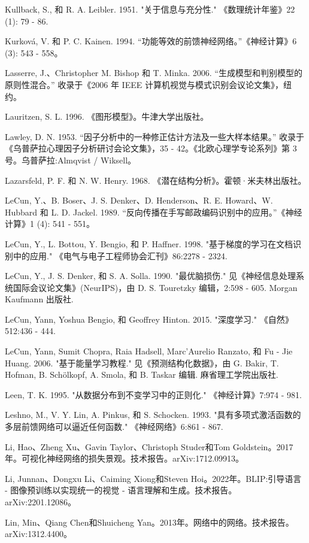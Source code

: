 \documentclass[10pt]{report}
\begin{document}
Kullback, S., 和 R. A. Leibler. 1951. "关于信息与充分性." 《数理统计年鉴》22 (1): 79 - 86.

Kurková, V. 和 P. C. Kainen. 1994. “功能等效的前馈神经网络。”《神经计算》6 (3): 543 - 558。

Lasserre, J.、Christopher M. Bishop 和 T. Minka. 2006. “生成模型和判别模型的原则性混合。” 收录于《2006 年 IEEE 计算机视觉与模式识别会议论文集》，纽约。

Lauritzen, S. L. 1996. 《图形模型》。牛津大学出版社。

Lawley, D. N. 1953. “因子分析中的一种修正估计方法及一些大样本结果。” 收录于《乌普萨拉心理因子分析研讨会论文集》，35 - 42。《北欧心理学专论系列》第 3 号。乌普萨拉:Almqvist / Wiksell。

Lazarsfeld, P. F. 和 N. W. Henry. 1968. 《潜在结构分析》。霍顿·米夫林出版社。

LeCun, Y.、B. Boser、J. S. Denker、D. Henderson、R. E. Howard、W. Hubbard 和 L. D. Jackel. 1989. “反向传播在手写邮政编码识别中的应用。”《神经计算》1 (4): 541 - 551。

LeCun, Y., L. Bottou, Y. Bengio, 和 P. Haffner. 1998. "基于梯度的学习在文档识别中的应用." 《电气与电子工程师协会汇刊》86:2278 - 2324.

LeCun, Y., J. S. Denker, 和 S. A. Solla. 1990. "最优脑损伤." 见《神经信息处理系统国际会议论文集》(NeurIPS)，由 D. S. Touretzky 编辑，2:598 - 605. Morgan Kaufmann 出版社.

LeCun, Yann, Yoshua Bengio, 和 Geoffrey Hinton. 2015. "深度学习." 《自然》512:436 - 444.

LeCun, Yann, Sumit Chopra, Raia Hadsell, Marc'Aurelio Ranzato, 和 Fu - Jie Huang. 2006. "基于能量学习教程." 见《预测结构化数据》，由 G. Bakir, T. Hofman, B. Schölkopf, A. Smola, 和 B. Taskar 编辑. 麻省理工学院出版社.

Leen, T. K. 1995. "从数据分布到不变学习中的正则化." 《神经计算》7:974 - 981.

Leshno, M., V. Y. Lin, A. Pinkus, 和 S. Schocken. 1993. "具有多项式激活函数的多层前馈网络可以逼近任何函数." 《神经网络》6:861 - 867.

Li, Hao、Zheng Xu、Gavin Taylor、Christoph Studer和Tom Goldstein。2017年。可视化神经网络的损失景观。技术报告。arXiv:1712.09913。

Li, Junnan、Dongxu Li、Caiming Xiong和Steven Hoi。2022年。BLIP:引导语言 - 图像预训练以实现统一的视觉 - 语言理解和生成。技术报告。arXiv:2201.12086。

Lin, Min、Qiang Chen和Shuicheng Yan。2013年。网络中的网络。技术报告。arXiv:1312.4400。
\end{document}
